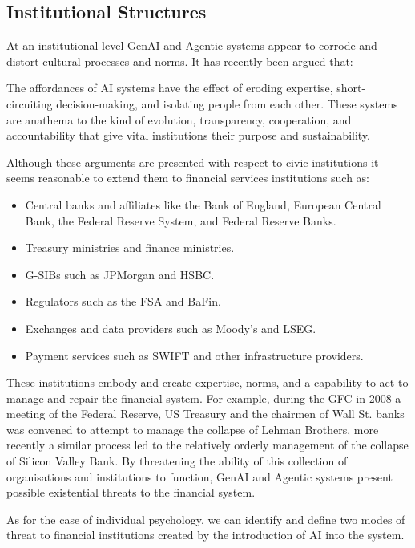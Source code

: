 \documentclass[11pt]{article}
\begin{document}
\subsection{Institutional Structures}
At an institutional level GenAI and Agentic systems appear to corrode and distort cultural processes and norms. It has recently been argued \citet{hartzog_how_2025} that:
\begin{displayquote}
The affordances of AI systems have the effect of eroding expertise, short-circuiting decision-making, and isolating people from each other. These systems are anathema to the kind of evolution, transparency, cooperation, and accountability that give vital institutions their purpose and sustainability.
\end{displayquote}
Although these arguments are presented with respect to civic institutions it seems reasonable to extend them to financial services institutions such as:
\begin{itemize}
\item Central banks and affiliates like the Bank of England, European Central Bank, the Federal Reserve System, and Federal Reserve Banks.
\item Treasury ministries and finance ministries.
\item G-SIBs such as JPMorgan and HSBC.
\item Regulators such as the FSA and BaFin.
\item Exchanges and data providers such as Moody's and LSEG.
\item Payment services such as SWIFT and other infrastructure providers.
\end{itemize}

These institutions embody and create expertise, norms, and a capability to act to manage and repair the financial system. For example, during the GFC in 2008 a meeting of the Federal Reserve, US Treasury and the chairmen of Wall St. banks was convened to attempt to manage the collapse of Lehman Brothers, more recently a similar process led to the relatively orderly management of the collapse of Silicon Valley Bank. By threatening the ability of this collection of organisations and institutions to function, GenAI and Agentic systems present possible existential threats to the financial system.

As for the case of individual psychology, we can identify and define two modes of threat to financial institutions created by the introduction of AI into the system. 
\end{document}
